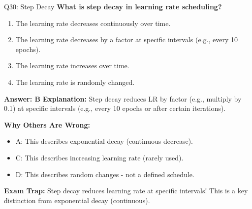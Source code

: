 \documentclass[8pt]{beamer}
\begin{document}
	\begin{frame}{Q30: Step Decay}
		\fontsize{6.5}{7.5}\selectfont
		\textbf{What is step decay in learning rate scheduling?}
		
		\begin{enumerate}
			\item The learning rate decreases continuously over time.
			\item The learning rate decreases by a factor at specific intervals (e.g., every 10 epochs).
			\item The learning rate increases over time.
			\item The learning rate is randomly changed.
		\end{enumerate}
		
		\vspace{0.05cm}
		\textcolor{myblue}{\textbf{Answer: B}}
		\vspace{0.05cm}
		\textcolor{myblue}{\textbf{Explanation:}} Step decay reduces LR by factor (e.g., multiply by 0.1) at specific intervals (e.g., every 10 epochs or after certain iterations).
		
		\vspace{0.05cm}
		\textcolor{myred}{\textbf{Why Others Are Wrong:}}
		\begin{itemize}
			\item \textcolor{myred}{A:} This describes exponential decay (continuous decrease).
			\item \textcolor{myred}{C:} This describes increasing learning rate (rarely used).
			\item \textcolor{myred}{D:} This describes random changes - not a defined schedule.
		\end{itemize}
		
		\textcolor{myred}{\textbf{Exam Trap:}} Step decay reduces learning rate \textcolor{myblue}{at specific intervals}! This is a key distinction from exponential decay (continuous).
	\end{frame}
	
\end{document}
